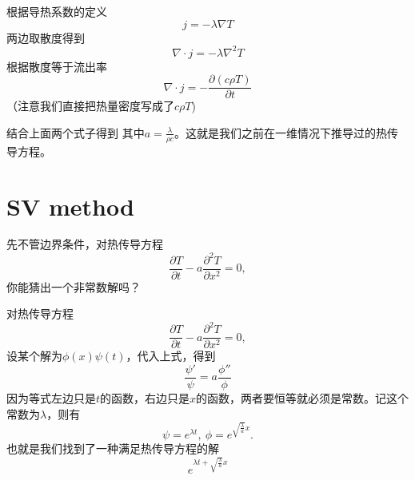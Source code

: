 \documentclass[CJK]{beamer}
\begin{document}
\begin{frame}
  \bch
  \ech
\end{frame}

\begin{frame}
  \bch
  {\small
  根据导热系数的定义
  $$j = -\lambda\nabla T$$
  两边取散度得到
  $$\nabla \cdot j = -\lambda \nabla^2T$$
  根据散度等于流出率
  $$\nabla\cdot j = -\frac{\partial (c\rho T)}{\partial t}$$
  （注意我们直接把热量密度写成了$c\rho T$)

    结合上面两个式子得到
    其中$a = \frac{\lambda}{\rho c}$。这就是我们之前在一维情况下推导过的热传导方程。
  }  
  \ech
\end{frame}

\section{SV method}


\begin{frame}
  \bch

  
  先不管边界条件，对热传导方程
  $$ \frac{\partial T}{\partial t} - a\frac{\partial^2T}{\partial x^2} = 0,$$
  你能猜出一个非常数解吗？
  
  \ech
\end{frame}


\begin{frame}
  \bch
{}
  \ech
\end{frame}


\begin{frame}
  \bch
  对热传导方程
  $$ \frac{\partial T}{\partial t} - a\frac{\partial^2T}{\partial x^2} = 0,$$
  设某个解为$\phi(x)\psi(t)$，代入上式，得到
  $$\frac{\psi'}{\psi} = a\frac{\phi''}{\phi} $$
  因为等式左边只是$t$的函数，右边只是$x$的函数，两者要恒等就必须是常数。记这个常数为$\lambda $，则有
  $$ \psi = e^{\lambda t},\ \phi = e^{ \sqrt{\frac{\lambda}{a}}x}.$$
  也就是我们找到了一种满足热传导方程的解
 $$e^{\lambda t + \sqrt{\frac{\lambda}{a}}x}$$
  \ech
\end{frame}
\end{document}
